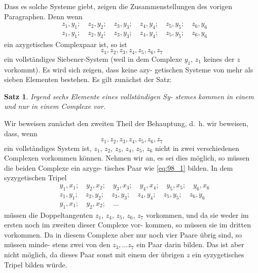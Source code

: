 \documentclass[12pt,a4paper]{article}
\theoremstyle{plain}
\newtheorem{satz}{Satz}[section]
\theoremstyle{definition}
\theoremstyle{remark}
\begin{document}
Dass es solche Systeme giebt, zeigen die Zusammenstellungen
des vorigen Paragraphen. Denn wenn
\begin{equation}\label{eq:98_1}
\begin{aligned}
&z_1, y_1; \quad z_2, y_2; \quad z_3, y_3; \quad z_4, y_4; \quad z_5, y_5; \quad z_6, y_6 \\
&z_1, y_1; \quad z_2, y_2; \quad z_3, y_3; \quad z_4, y_4; \quad z_5, y_5; \quad z_6, y_6
\end{aligned}
\end{equation}
ein azygetisches Complexpaar ist, so ist
\begin{equation*}
z_1, z_2, z_3, z_4, z_5, z_6, z_7
\end{equation*}
ein vollständiges Siebener-System (weil in dem Complexe $y_1$, $z_1$
keines der $z$ vorkommt). Es wird sich zeigen, dass keine azy-
getischen Systeme von mehr als sieben Elementen bestehen. Es
gilt zunächst der Satz:

\begin{satz}
Irgend sechs Elemente eines vollständigen Sy-
stemes kommen in einem und nur in einem
Complexe vor.
\end{satz}

Wir beweisen zunächst den zweiten Theil der Behauptung,
d.~h. wir beweisen, dass, wenn
\begin{equation}\label{eq:98_2}
z_1, z_2, z_3, z_4, z_5, z_6, z_7
\end{equation}
ein vollständiges System ist, $z_1$, $z_2$, $z_3$, $z_4$, $z_5$, $z_6$ nicht in zwei
verschiedenen Complexen vorkommen können. Nehmen wir an,
es sei dies möglich, so müssen die beiden Complexe ein azyge-
tisches Paar wie \eqref{eq:98_1} bilden. In dem syzygetischen Tripel
\begin{equation*}
\begin{aligned}
&y_1, x_1; \quad y_2, x_2; \quad y_3, x_3; \quad y_4, x_4; \quad y_5, x_5; \quad y_6, x_6 \\
&z_1, y_1; \quad z_2, y_2; \quad z_3, y_3; \quad z_4, y_4; \quad z_5, y_5; \quad z_6, y_6 \\
&y_1, x_1; \quad y_2, x_2; \quad \ldots
\end{aligned}
\end{equation*}
müssen die Doppeltangenten $z_1$, $z_4$, $z_5$, $z_6$, $z_7$ vorkommen, und
da sie weder im ersten noch im zweiten dieser Complexe vor-
kommen, so müssen sie im dritten vorkommen. Da in diesem
Complexe aber nur noch vier Paare übrig sind, so müssen minde-
stens zwei von den $z_3, \ldots z_7$ ein Paar darin bilden. Das ist
aber nicht möglich, da dieses Paar sonst mit einem der übrigen $z$
ein syzygetisches Tripel bilden würde.
\end{document}
